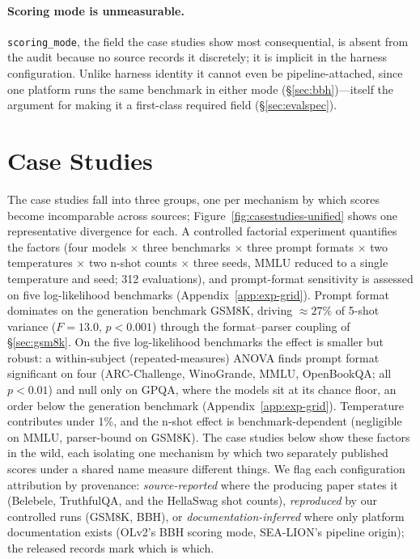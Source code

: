 \documentclass[11pt]{article}
\begin{document}
\paragraph{Scoring mode is unmeasurable.}
\texttt{scoring\_mode}, the field the case studies show most consequential, is
absent from the audit because no source records it discretely; it is implicit in
the harness configuration. Unlike harness identity it cannot even be
pipeline-attached, since one platform runs the same benchmark in either mode
(\S\ref{sec:bbh})---itself the argument for making it a first-class required field
(\S\ref{sec:evalspec}).

\section{Case Studies}
\label{sec:cases}

The case studies fall into three groups, one per mechanism by which scores
become incomparable across sources; Figure~\ref{fig:casestudies-unified} shows one
representative divergence for each. A controlled factorial experiment
quantifies the factors (four models $\times$ three benchmarks $\times$ three
prompt formats $\times$ two temperatures $\times$ two n-shot counts $\times$ three
seeds, MMLU reduced to a single temperature and seed; 312 evaluations), and
prompt-format sensitivity is assessed on five log-likelihood benchmarks
(Appendix~\ref{app:exp-grid}). Prompt format dominates on the generation benchmark
GSM8K, driving ${\approx}27\%$ of 5-shot variance ($F = 13.0$, $p < 0.001$)
through the format--parser coupling of \S\ref{sec:gsm8k}. On the five
log-likelihood benchmarks the effect is smaller but robust: a within-subject
(repeated-measures) ANOVA finds prompt format significant on four
(ARC-Challenge, WinoGrande, MMLU, OpenBookQA; all $p<0.01$) and null only on GPQA,
where the models sit at its chance floor, an order below the generation benchmark
(Appendix~\ref{app:exp-grid}).
Temperature contributes under 1\%, and the n-shot effect is benchmark-dependent
(negligible on MMLU, parser-bound on GSM8K). The case studies below show these
factors in the wild, each isolating one mechanism by which two separately published
scores under a shared name measure different things. We flag each configuration
attribution by provenance: \emph{source-reported} where the producing paper states
it (Belebele, TruthfulQA, and the HellaSwag shot counts), \emph{reproduced} by our
controlled runs (GSM8K, BBH), or \emph{documentation-inferred} where only platform
documentation exists (OLv2's BBH scoring mode, SEA-LION's pipeline origin); the
released records mark which is which.
\end{document}

